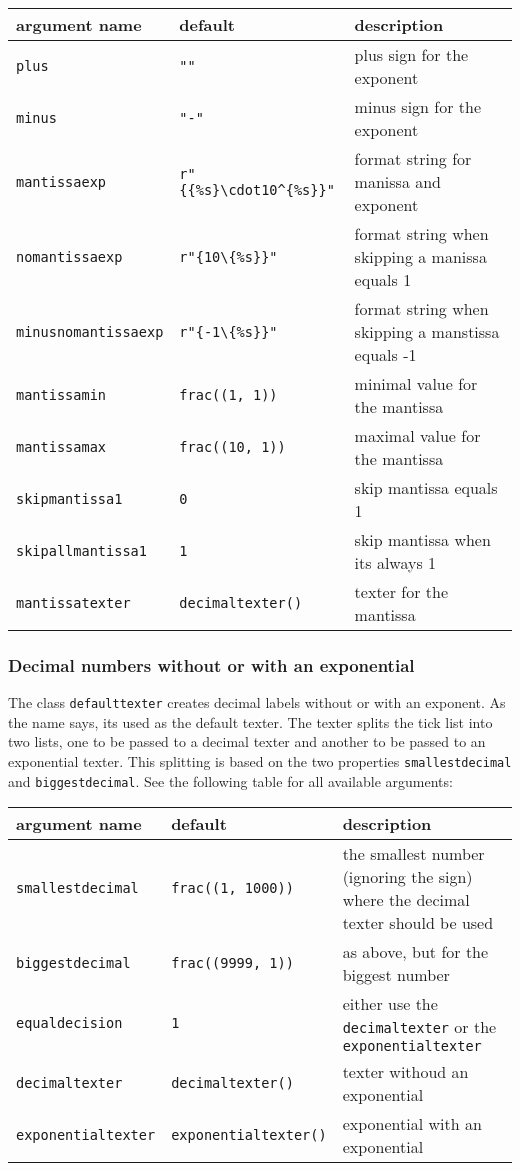 \medskip
\begin{tabularx}{\linewidth}{ll>{\raggedright\arraybackslash}X}
argument name&default&description\\
\hline
\texttt{plus}&\texttt{""}&plus sign for the exponent\\
\texttt{minus}&\texttt{"-"}&minus sign for the exponent\\
\texttt{mantissaexp}&\texttt{r"\{\{\%s\}\textbackslash cdot10\textasciicircum\{\%s\}\}"}&format string for manissa and exponent\\
\texttt{nomantissaexp}&\texttt{r"\{10\textbackslash\{\%s\}\}"}&format string when skipping a manissa equals 1\\
\texttt{minusnomantissaexp}&\texttt{r"\{-1\textbackslash\{\%s\}\}"}&format string when skipping a manstissa equals -1\\
\texttt{mantissamin}&\texttt{frac((1, 1))}&minimal value for the mantissa\\
\texttt{mantissamax}&\texttt{frac((10, 1))}&maximal value for the mantissa\\
\texttt{skipmantissa1}&\texttt{0}&skip mantissa equals 1\\
\texttt{skipallmantissa1}&\texttt{1}&skip mantissa when its always 1\\
\texttt{mantissatexter}&\texttt{decimaltexter()}&texter for the mantissa\\
\end{tabularx}
\medskip

\subsubsection{Decimal numbers without or with an exponential}

The class \verb|defaulttexter| creates decimal labels without or
with an exponent. As the name says, its used as the default texter.
The texter splits the tick list into two lists, one to be passed to a
decimal texter and another to be passed to an exponential texter. This
splitting is based on the two properties \verb|smallestdecimal| and
\verb|biggestdecimal|. See the following table for all available
arguments:

\medskip
\begin{tabularx}{\linewidth}{ll>{\raggedright\arraybackslash}X}
argument name&default&description\\
\hline
\texttt{smallestdecimal}&\texttt{frac((1, 1000))}&the smallest number (ignoring the sign) where the decimal texter should be used\\
\texttt{biggestdecimal}&\texttt{frac((9999, 1))}&as above, but for the biggest number\\
\texttt{equaldecision}&\texttt{1}&either use the \texttt{decimaltexter} or the \texttt{exponentialtexter}\\
\texttt{decimaltexter}&\texttt{decimaltexter()}&texter withoud an exponential\\
\texttt{exponentialtexter}&\texttt{exponentialtexter()}&exponential with an exponential\\
\end{tabularx}
\medskip


